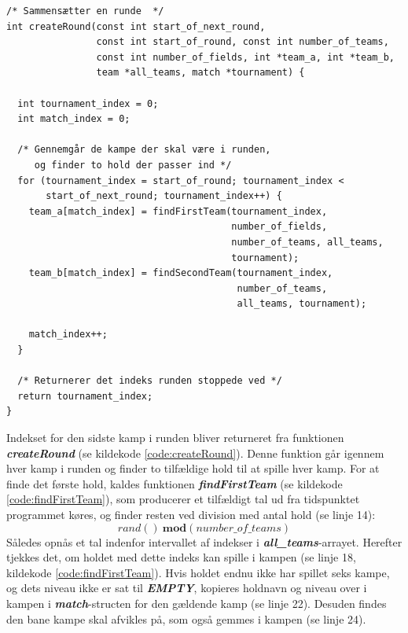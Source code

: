 \hspace{3 cm}
\clearpage
\begin{source}
\begin{verbatim}
/* Sammensætter en runde  */
int createRound(const int start_of_next_round, 
                const int start_of_round, const int number_of_teams, 
                const int number_of_fields, int *team_a, int *team_b, 
                team *all_teams, match *tournament) {
                
  int tournament_index = 0;
  int match_index = 0;

  /* Gennemgår de kampe der skal være i runden, 
     og finder to hold der passer ind */
  for (tournament_index = start_of_round; tournament_index < 
       start_of_next_round; tournament_index++) {
    team_a[match_index] = findFirstTeam(tournament_index, 
                                        number_of_fields, 
                                        number_of_teams, all_teams, 
                                        tournament);
    team_b[match_index] = findSecondTeam(tournament_index, 
                                         number_of_teams, 
                                         all_teams, tournament);

    match_index++;
  }

  /* Returnerer det indeks runden stoppede ved */
  return tournament_index;
}
\end{verbatim}
\label{code:createRound}
\end{source}
\clearpage
Indekset for den sidste kamp i runden bliver returneret fra funktionen \textbf{\textit{createRound}} (se kildekode \ref{code:createRound}). Denne funktion går igennem hver kamp i runden og finder to tilfældige hold til at spille hver kamp. For at finde det første hold, kaldes funktionen \textbf{\textit{findFirstTeam}} (se kildekode \ref{code:findFirstTeam}), som producerer et tilfældigt tal ud fra tidspunktet programmet køres, og finder resten ved division med antal hold (se linje 14):
\[rand() \ \textbf{mod}(number\_of\_teams)\]
Således opnås et tal indenfor intervallet af indekser i \textbf{\textit{all\_teams}}-arrayet. Herefter tjekkes det, om holdet med dette indeks kan spille i kampen (se linje 18, kildekode \ref{code:findFirstTeam}). Hvis holdet endnu ikke har spillet seks kampe, og dets niveau ikke er sat til \textbf{\textit{EMPTY}}, kopieres holdnavn og niveau over i kampen i \textbf{\textit{match}}-structen for den gældende kamp (se linje 22). Desuden findes den bane kampe skal afvikles på, som også gemmes i kampen (se linje 24).
